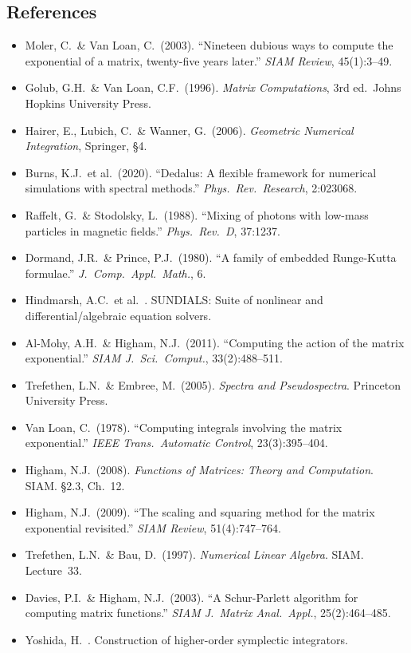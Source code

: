 \subsection{References}
\label{sec:modal-references}

\begin{itemize}
  \item Moler, C.\ \& Van Loan, C.\ (2003). ``Nineteen dubious ways to compute the exponential of a matrix, twenty-five years later.'' \emph{SIAM Review}, 45(1):3--49.
  \item Golub, G.H.\ \& Van Loan, C.F.\ (1996). \emph{Matrix Computations}, 3rd ed.\ Johns Hopkins University Press.
  \item Hairer, E., Lubich, C.\ \& Wanner, G.\ (2006). \emph{Geometric Numerical Integration}, Springer, \S4.
  \item Burns, K.J.\ et al.\ (2020). ``Dedalus: A flexible framework for numerical simulations with spectral methods.'' \emph{Phys.\ Rev.\ Research}, 2:023068.
  \item Raffelt, G.\ \& Stodolsky, L.\ (1988). ``Mixing of photons with low-mass particles in magnetic fields.'' \emph{Phys.\ Rev.\ D}, 37:1237.
  \item Dormand, J.R.\ \& Prince, P.J.\ (1980). ``A family of embedded Runge-Kutta formulae.'' \emph{J.\ Comp.\ Appl.\ Math.}, 6.
  \item Hindmarsh, A.C.\ et al.~\cite{hindmarsh2005sundials}. SUNDIALS: Suite of nonlinear and differential/algebraic equation solvers.
  \item Al-Mohy, A.H.\ \& Higham, N.J.\ (2011). ``Computing the action of the matrix exponential.'' \emph{SIAM J.\ Sci.\ Comput.}, 33(2):488--511.
  \item Trefethen, L.N.\ \& Embree, M.\ (2005). \emph{Spectra and Pseudospectra}. Princeton University Press.
  \item Van Loan, C.\ (1978). ``Computing integrals involving the matrix exponential.'' \emph{IEEE Trans.\ Automatic Control}, 23(3):395--404.
  \item Higham, N.J.\ (2008). \emph{Functions of Matrices: Theory and Computation}. SIAM. \S2.3, Ch.\ 12.
  \item Higham, N.J.\ (2009). ``The scaling and squaring method for the matrix exponential revisited.'' \emph{SIAM Review}, 51(4):747--764.
  \item Trefethen, L.N.\ \& Bau, D.\ (1997). \emph{Numerical Linear Algebra}. SIAM. Lecture~33.
  \item Davies, P.I.\ \& Higham, N.J.\ (2003). ``A Schur-Parlett algorithm for computing matrix functions.'' \emph{SIAM J.\ Matrix Anal.\ Appl.}, 25(2):464--485.
  \item Yoshida, H.~\cite{yoshida1990symplectic}. Construction of higher-order symplectic integrators.
\end{itemize}
